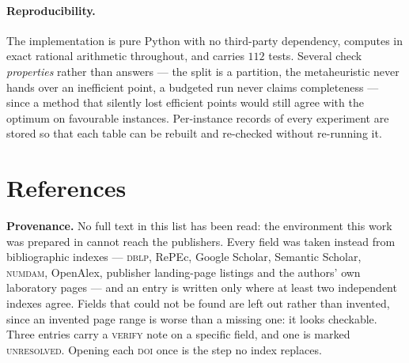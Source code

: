 \documentclass[11pt,a4paper]{article}
\begin{document}
\paragraph{Reproducibility.}  The implementation is pure Python with no
third-party dependency, computes in exact rational arithmetic throughout, and
carries $112$ tests.  Several check \emph{properties} rather than answers --- the
split is a partition, the metaheuristic never hands over an inefficient point,
a budgeted run never claims completeness --- since a method that silently lost
efficient points would still agree with the optimum on favourable instances.
Per-instance records of every experiment are stored so that each table can be
rebuilt and re-checked without re-running it.

\section*{References}

\noindent
\textbf{Provenance.}  No full text in this list has been read: the
environment this work was prepared in cannot reach the publishers.  Every
field was taken instead from bibliographic indexes --- \textsc{dblp},
RePEc, Google Scholar, Semantic Scholar, \textsc{numdam}, OpenAlex,
publisher landing-page listings and the authors' own laboratory pages ---
and an entry is written only where at least two independent indexes agree.
Fields that could not be found are left out rather than invented, since an
invented page range is worse than a missing one: it looks checkable.  Three
entries carry a \textsc{verify} note on a specific field, and one is marked
\textsc{unresolved}.  Opening each \textsc{doi} once is the step no index
replaces.



\end{document}
